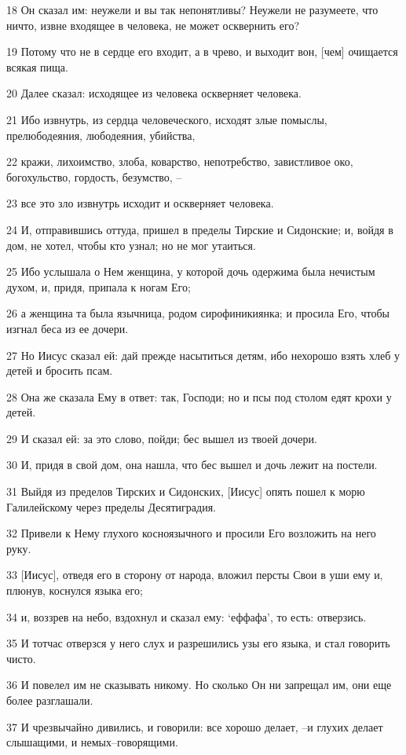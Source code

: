 \par 18 Он сказал им: неужели и вы так непонятливы? Неужели не разумеете, что ничто, извне входящее в человека, не может осквернить его?
\par 19 Потому что не в сердце его входит, а в чрево, и выходит вон, [чем] очищается всякая пища.
\par 20 Далее сказал: исходящее из человека оскверняет человека.
\par 21 Ибо извнутрь, из сердца человеческого, исходят злые помыслы, прелюбодеяния, любодеяния, убийства,
\par 22 кражи, лихоимство, злоба, коварство, непотребство, завистливое око, богохульство, гордость, безумство, --
\par 23 все это зло извнутрь исходит и оскверняет человека.
\par 24 И, отправившись оттуда, пришел в пределы Тирские и Сидонские; и, войдя в дом, не хотел, чтобы кто узнал; но не мог утаиться.
\par 25 Ибо услышала о Нем женщина, у которой дочь одержима была нечистым духом, и, придя, припала к ногам Его;
\par 26 а женщина та была язычница, родом сирофиникиянка; и просила Его, чтобы изгнал беса из ее дочери.
\par 27 Но Иисус сказал ей: дай прежде насытиться детям, ибо нехорошо взять хлеб у детей и бросить псам.
\par 28 Она же сказала Ему в ответ: так, Господи; но и псы под столом едят крохи у детей.
\par 29 И сказал ей: за это слово, пойди; бес вышел из твоей дочери.
\par 30 И, придя в свой дом, она нашла, что бес вышел и дочь лежит на постели.
\par 31 Выйдя из пределов Тирских и Сидонских, [Иисус] опять пошел к морю Галилейскому через пределы Десятиградия.
\par 32 Привели к Нему глухого косноязычного и просили Его возложить на него руку.
\par 33 [Иисус], отведя его в сторону от народа, вложил персты Свои в уши ему и, плюнув, коснулся языка его;
\par 34 и, воззрев на небо, вздохнул и сказал ему: `еффафа', то есть: отверзись.
\par 35 И тотчас отверзся у него слух и разрешились узы его языка, и стал говорить чисто.
\par 36 И повелел им не сказывать никому. Но сколько Он ни запрещал им, они еще более разглашали.
\par 37 И чрезвычайно дивились, и говорили: все хорошо делает, --и глухих делает слышащими, и немых--говорящими.

